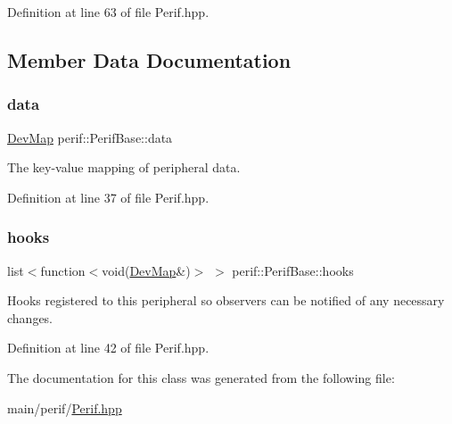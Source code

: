 Definition at line 63 of file Perif.\+hpp.


\begin{DoxyCode}{0}

\end{DoxyCode}


\subsection{Member Data Documentation}
\mbox{\label{classperif_1_1PerifBase_a1a3afaa535fda17e9f97123fffe78765}} 
\subsubsection{\texorpdfstring{data}{data}}
{\footnotesize\ttfamily \mbox{\hyperlink{Perif_8hpp_a358ff4ee6d24694ee7661f0cce14377e}{Dev\+Map}} perif\+::\+Perif\+Base\+::data}

The key-\/value mapping of peripheral data. 

Definition at line 37 of file Perif.\+hpp.

\mbox{\label{classperif_1_1PerifBase_a98964e5ca8384df64881265e0aa6d7b6}} 
\subsubsection{\texorpdfstring{hooks}{hooks}}
{\footnotesize\ttfamily list$<$function$<$void(\mbox{\hyperlink{Perif_8hpp_a358ff4ee6d24694ee7661f0cce14377e}{Dev\+Map}}\&)$>$ $>$ perif\+::\+Perif\+Base\+::hooks}

Hooks registered to this peripheral so observers can be notified of any necessary changes. 

Definition at line 42 of file Perif.\+hpp.



The documentation for this class was generated from the following file\+:\begin{DoxyCompactItemize}
\item 
main/perif/\mbox{\hyperlink{Perif_8hpp}{Perif.\+hpp}}\end{DoxyCompactItemize}
